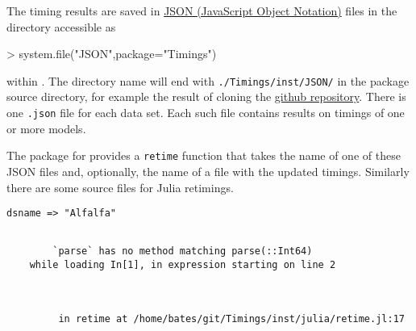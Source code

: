 \documentclass[article]{jss}
\begin{document}
The timing results are saved in \href{http://json.org}{JSON (JavaScript
Object Notation)} files in the directory accessible as

\begin{Schunk}
\begin{Sinput}
> system.file("JSON",package="Timings")
\end{Sinput}
\end{Schunk}

within . The directory name will end with
\texttt{./Timings/inst/JSON/} in the package source directory, for
example the result of cloning the
\href{https://github.com/Stat990-033/Timings}{github repository}. There
is one \texttt{.json} file for each data set. Each such file contains
results on timings of one or more models.

The  package for  provides a \texttt{retime}
function that takes the name of one of these JSON files and, optionally,
the name of a file with the updated timings. Similarly there are some
source files for Julia retimings.


    \begin{Verbatim}[commandchars=\\\{\}]
dsname => "Alfalfa"
    \end{Verbatim}

    \begin{Verbatim}[commandchars=\\\{\}]

        `parse` has no method matching parse(::Int64)
    while loading In[1], in expression starting on line 2

        

         in retime at /home/bates/git/Timings/inst/julia/retime.jl:17

    \end{Verbatim}
\end{document}
